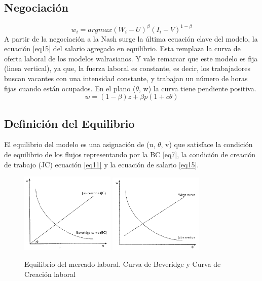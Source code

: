 \documentclass[12pt,oneside]{reedthesis}
\begin{document}
\subsection{Negociación}
\begin{equation} \label{eq14}
w_i = argmax (W_{i} - U)^{\beta} (I_{i}-V)^{1-\beta}
\end{equation}
A partir de la negociación a la Nash surge la última ecuación clave del modelo, la ecuación \eqref{eq15} del salario agregado en equilibrio. Esta remplaza la curva de oferta laboral de los modelos walrasianos. Y vale remarcar que este modelo es fija (linea vertical), ya que, la fuerza laboral es constante, es decir, los trabajadores buscan vacantes con una intensidad constante, y trabajan un número de horas fijas cuando están ocupados. En el plano (\(\theta\), w) la curva tiene pendiente positiva.
\begin{equation} \label{eq15}
w = (1 - \beta)z + \beta p(1 + c\theta)
\end{equation}
\subsection{Definición del Equilibrio}

El equilibrio del modelo es una asignación de (u, \(\theta\), v) que satisface la condición de equilibrio de los flujos representando por la BC \eqref{eq7}, la condición de creación de trabajo (JC) ecuación \eqref{eq11} y la ecuación de salario \eqref{eq15}.
\begin{figure}[h!]
    \centering
    {%
        \includegraphics[width=0.4\textwidth]{JC_BC_(v,u).png}%
        \label{fig:a}%
    }%
    \hfill%
    {%
        \includegraphics[width=0.4\textwidth]{WC_JC_(w,theta).png}%
        \label{fig:b}%
    }%
    \caption{Equilibrio del mercado laboral. Curva de Beveridge y Curva de Creación laboral}
\end{figure}
\newpage
\end{document}
